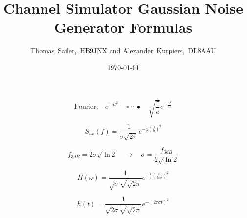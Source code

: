 \documentclass[11pt,twoside,a4paper]{article}
\author{Thomas~Sailer,~HB9JNX and Alexander~Kurpiers,~DL8AAU}
\title{Channel Simulator Gaussian Noise Generator Formulas}
\date{\today}
\begin{document}
\maketitle

\newcommand{\fourierpair}{\circ\cdots\bullet}

\begin{equation}
  \text{Fourier:}\quad
  e^{-a t^2}\quad\fourierpair\quad
  \sqrt{\frac{\pi}{a}}e^{-\frac{\omega^2}{4a}}
\end{equation}

\begin{equation}
  S_{xx}(f) = \frac{1}{\sigma\sqrt{2\pi}}e^{-\frac{1}{2}\left(\frac{f}{\sigma}\right)^2}
\end{equation}

\begin{equation}
  f_{3dB} = 2\sigma\sqrt{\ln 2}
  \quad\longrightarrow\quad
  \sigma = \frac{f_{3dB}}{2\sqrt{\ln 2}}
\end{equation}

\begin{equation}
  H(\omega) = \frac{1}{\sqrt{\sigma}\sqrt{\sqrt{2\pi}}}e^{-\frac{1}{4}\left(\frac{\omega}{2\pi\sigma}\right)^2}
\end{equation}

\begin{equation}
  h(t) = \frac{1}{\sqrt{2\sigma}\sqrt{\sqrt{2\pi}}}e^{-\left(2\pi\sigma{}t\right)^2}
\end{equation}
\end{document}
